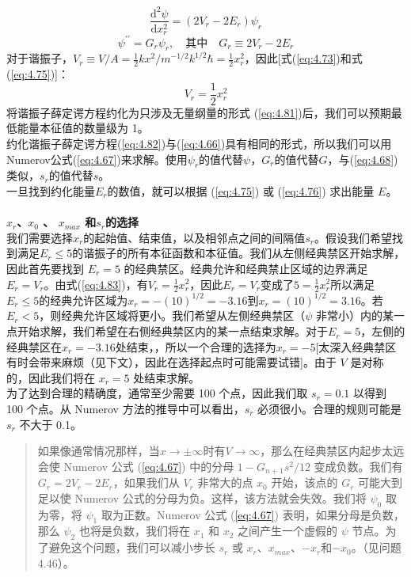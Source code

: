     \begin{equation}
        \frac{\mathrm{d}^2\psi}{\mathrm{d}x_r^2} = \left(2V_r-2E_r\right)\psi_r
        \label{eq:4.81}
    \end{equation}
    \begin{equation}
        \psi^{\prime\prime} = G_r\psi_r, \quad \text{其中} \quad G_r \equiv 2V_r-2E_r
        \label{eq:4.82}
    \end{equation}
    对于谐振子，$V_r \equiv V/A = \frac{1}{2}kx^2/m^{-1/2}k^{1/2}\hbar = \frac{1}{2}x_r^2$，因此[式(\ref{eq:4.73})和式(\ref{eq:4.75})]：
    \begin{equation}
        V_r = \frac{1}{2}x_r^2
        \label{eq:4.83}
    \end{equation}
    \indent 将谐振子薛定谔方程约化为只涉及无量纲量的形式 (\ref{eq:4.81})后，我们可以预期最低能量本征值的数量级为 1。\\
    \indent 约化谐振子薛定谔方程(\ref{eq:4.82})与(\ref{eq:4.66})具有相同的形式，所以我们可以用Numerov公式(\ref{eq:4.67})来求解。使用$\psi_r$的值代替$\psi$，$G_r$的值代替$G$，与(\ref{eq:4.68})类似，$s_r$的值代替$s$。\\
    \indent 一旦找到约化能量$E_r$的数值，就可以根据 (\ref{eq:4.75}) 或 (\ref{eq:4.76}) 求出能量 $E$。\\
    \\
    \textbf{$x_r$、$x_0$ 、 $x_{max}$ 和$s_r$的选择}\\
    \indent 我们需要选择$x_r$的起始值、结束值，以及相邻点之间的间隔值$s_r$。假设我们希望找到满足$E_r \le 5$的谐振子的所有本征函数和本征值。我们从左侧经典禁区开始求解，因此首先要找到 $E_r=5$ 的经典禁区。经典允许和经典禁止区域的边界满足$E_r=V_r$。由式(\ref{eq:4.83})，有$V_r = \frac{1}{2}x_r^2$，因此$E_r=V_r$变成了$5=\frac{1}{2}x_r^2$所以满足$E_r \le 5$的经典允许区域为$x_r = -\left(10\right)^{1/2}=-3.16$到$x_r = \left(10\right)^{1/2}=3.16$。若$E_r<5$，则经典允许区域将更小。我们希望从左侧经典禁区（$\psi$ 非常小）内的某一点开始求解，我们希望在右侧经典禁区内的某一点结束求解。对于$E_r=5$，左侧的经典禁区在$x_r=-3.16$处结束，，所以一个合理的选择为$x_r=-5$[太深入经典禁区有时会带来麻烦（见下文），因此在选择起点时可能需要试错]。由于 $V$ 是对称的，因此我们将在 $x_r=5$ 处结束求解。\\
    \indent 为了达到合理的精确度，通常至少需要 100 个点，因此我们取 $s_r=0.1$ 以得到 100 个点。从 Numerov 方法的推导中可以看出，$s_r$ 必须很小。合理的规则可能是 $s_r$ 不大于 0.1。
    \begin{quote}
        \small
        \noindent
        如果像通常情况那样，当$x \to \pm \infty$时有$V \to \infty$，那么在经典禁区内起步太远会使 Numerov 公式 (\ref{eq:4.67}) 中的分母 $1-G_{n+1}s^2/12$ 变成负数。我们有 $G_r=2V_r-2E_r$，如果我们从 $V_r$ 非常大的点 $x_0$ 开始，该点的 $G_r$ 可能大到足以使 Numerov 公式的分母为负。这样，该方法就会失效。我们将 $\psi_0$ 取为零，将 $\psi_1$ 取为正数。Numerov 公式 (\ref{eq:4.67}) 表明，如果分母是负数，那么 $\psi_2$ 也将是负数，我们将在 $x_1$ 和 $x_2$ 之间产生一个虚假的 $\psi$ 节点。为了避免这个问题，我们可以减小步长 $s_r$ 或 $x_r$、$x_{max}$、$-x_r$和$-x_0$。（见问题 4.46）。
    \end{quote}

